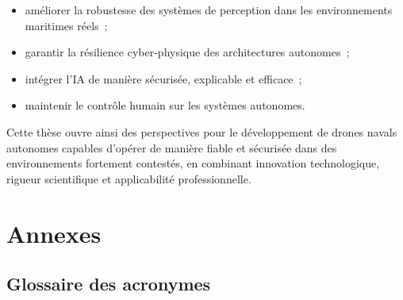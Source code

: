 \documentclass[12pt, a4paper, twoside, openright]{report}
\begin{document}
\begin{itemize}
    \item améliorer la robustesse des systèmes de perception dans les environnements maritimes réels~;
    \item garantir la résilience cyber-physique des architectures autonomes~;
    \item intégrer l'IA de manière sécurisée, explicable et efficace~;
    \item maintenir le contrôle humain sur les systèmes autonomes.
\end{itemize}

Cette thèse ouvre ainsi des perspectives pour le développement de drones navals autonomes capables d'opérer de manière fiable et sécurisée dans des environnements fortement contestés, en combinant innovation technologique, rigueur scientifique et applicabilité professionnelle.

\cleardoublepage

\printbibliography[title=Bibliographie]

\appendix
\chapter{Annexes}

\section{Glossaire des acronymes}
\end{document}
